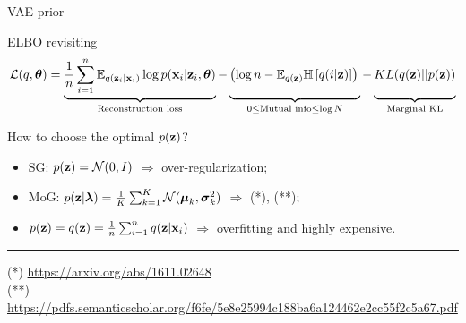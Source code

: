 \begin{frame}{VAE prior}
\begin{block}{ELBO revisiting}
\vspace{-0.3cm}
{\footnotesize
\[
    \mathcal{L}(q, \btheta) = \underbrace{\frac{1}{n} \sum_{i=1}^n \mathbb{E}_{q(\bz_i | \bx_i)} \log p(\bx_i | \bz_i, \btheta)}_{\text{Reconstruction loss}} - \underbrace{\left(\log n - \mathbb{E}_{q(\bz)} \mathbb{H} \left[ q(i | \bz) \right] \right)\vphantom{\sum_{i=1}}}_{0 \leq \text{Mutual info} \leq \log N } - \underbrace{KL(q(\bz) || p(\bz))\vphantom{\sum_{i=1}}}_{\text{Marginal KL}}
\]}
\end{block}

How to choose the optimal $p(\mathbf{z})$?
\begin{itemize}
    \item SG: $p(\mathbf{z}) = \mathcal{N}(0, I)$ $\Rightarrow$ over-regularization;
    \vspace{0.1cm}
    \item MoG: $p(\mathbf{z} | \boldsymbol{\lambda}) = \frac{1}{K} \sum_{k=1}^K \mathcal{N}(\boldsymbol{\mu}_k, \boldsymbol{\sigma}_k^2)$ $\Rightarrow$ (*), (**);
    \vspace{0.1cm}
    \item $p(\mathbf{z}) = q(\mathbf{z}) = \frac{1}{n}\sum_{i=1}^n q(\mathbf{z} | \mathbf{x}_i)$ $\Rightarrow$ overfitting and highly expensive.
\end{itemize}
\vfill
\hrule\medskip
{\tiny 
(*) \href{https://arxiv.org/abs/1611.02648}{https://arxiv.org/abs/1611.02648} \\
(**) \href{https://pdfs.semanticscholar.org/f6fe/5e8e25994c188ba6a124462e2cc55f2c5a67.pdf}{https://pdfs.semanticscholar.org/f6fe/5e8e25994c188ba6a124462e2cc55f2c5a67.pdf}}

\end{frame}
